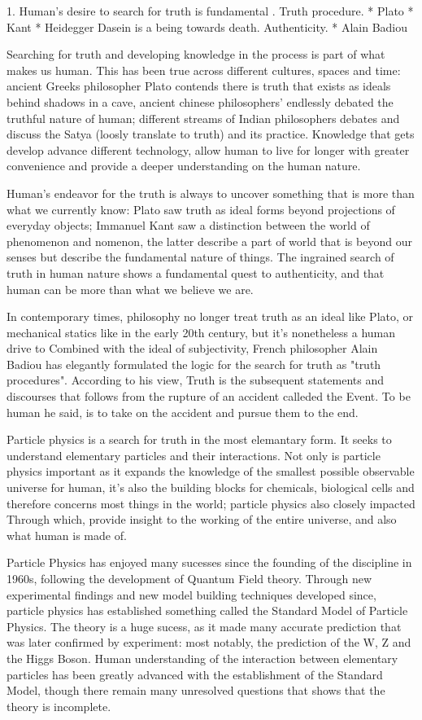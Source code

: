 1. Human's desire to search for truth is fundamental . Truth procedure. 
* Plato 
* Kant 
* Heidegger  Dasein is a being towards death.
Authenticity. 
* Alain Badiou 

Searching for truth and developing knowledge in the process is part of what makes us human. This has been true across different cultures, spaces and time: ancient Greeks philosopher Plato contends there is truth that exists as ideals behind shadows in a cave, ancient chinese philosophers' endlessly debated the truthful nature of human; different streams of Indian philosophers debates and discuss the Satya (loosly translate to truth) and its practice. Knowledge that gets develop advance different technology, allow human to live for longer with greater convenience and provide a deeper understanding on the human nature. 

Human's endeavor for the truth is always to uncover something that is more than what we currently know: Plato saw truth as ideal forms beyond projections of everyday objects; Immanuel Kant saw a distinction between the world of phenomenon and nomenon, the latter describe a part of world that is beyond our senses but describe the fundamental nature of things. 
The ingrained search of truth in human nature shows a fundamental quest to authenticity, and that human can be more than what we believe we are. 

In contemporary times, philosophy no longer treat truth as an ideal like Plato, or mechanical statics like in the early 20th century, but it's nonetheless a human drive to 
Combined with the ideal of subjectivity, French philosopher Alain Badiou has elegantly formulated the logic for the search for truth as "truth procedures". According to his view, Truth is the subsequent statements and discourses that follows from the rupture of an accident calleded the Event. To be human he said, is to take on the accident and pursue them to the end. 

Particle physics is a search for truth in the most elemantary form. It seeks to understand elementary particles and their interactions. Not only is particle physics important as it expands the knowledge of the smallest possible observable universe for human, it's also the building blocks for chemicals, biological cells and therefore concerns most things in the world; particle physics also closely impacted Through which, provide insight to the working of the entire universe, and also what human is made of. 

Particle Physics has enjoyed many sucesses since the founding of the discipline in 1960s, following the development of Quantum Field theory.
Through new experimental findings and new model building techniques developed since, particle physics has established something called the Standard Model of Particle Physics. The theory is a huge sucess, as it made many accurate prediction that was later confirmed by experiment: most notably, the prediction of the W, Z and the Higgs Boson. Human understanding of the interaction between elementary particles has been greatly advanced with the establishment of the Standard Model, though there remain many unresolved questions that shows that the theory is incomplete. 

